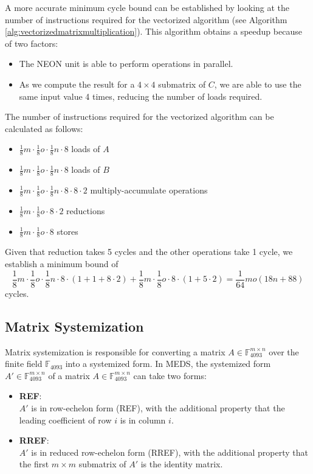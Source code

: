 \documentclass[11pt,a4paper]{report}
\theoremstyle{definition}
\begin{document}
A more accurate minimum cycle bound can be established by looking at the number of instructions required for the vectorized algorithm (see Algorithm \ref{alg:vectorizedmatrixmultiplication}). This algorithm obtains a speedup because of two factors:
\begin{itemize}
  \item The NEON unit is able to perform operations in parallel.
  \item As we compute the result for a $4\times4$ submatrix of $C$, we are able to use the same input value 4 times, reducing the number of loads required.
\end{itemize}
The number of instructions required for the vectorized algorithm can be calculated as follows:
\begin{itemize}
  \item $\frac{1}{8}m \cdot \frac{1}{8}o \cdot \frac{1}{8}n \cdot 8$ loads of $A$
  \item $\frac{1}{8}m \cdot \frac{1}{8}o \cdot \frac{1}{8}n \cdot 8$ loads of $B$
  \item $\frac{1}{8}m \cdot \frac{1}{8}o \cdot \frac{1}{8}n \cdot 8 \cdot 8 \cdot 2$ multiply-accumulate operations
  \item $\frac{1}{8}m \cdot \frac{1}{8}o \cdot 8 \cdot 2$ reductions
  \item $\frac{1}{8}m \cdot \frac{1}{8}o \cdot 8$ stores
\end{itemize}
Given that reduction takes 5 cycles and the other operations take 1 cycle, we establish a minimum bound of 
\[
  \frac{1}{8}m \cdot \frac{1}{8}o \cdot \frac{1}{8}n \cdot 8 \cdot (1 + 1 + 8 \cdot 2) + \frac{1}{8}m \cdot \frac{1}{8}o \cdot 8 \cdot (1 + 5 \cdot 2) = \frac{1}{64}mo(18n + 88)
\]
cycles.

\subsection{Matrix Systemization}
\label{sec:matrixsystemization}
Matrix systemization is responsible for converting a matrix $A \in \mathbb{F}_{4093}^{m \times n}$ over the finite field $\mathbb{F}_{4093}$ into a systemized form. In MEDS, the systemized form $A' \in \mathbb{F}_{4093}^{m \times n}$ of a matrix $A \in \mathbb{F}_{4093}^{m \times n}$ can take two forms:
\begin{itemize}
  \item \textbf{REF}:\\
  $A'$ is in row-echelon form (REF), with the additional property that the leading coefficient of row $i$ is in column $i$.
  \item \textbf{RREF}:\\
  $A'$ is in reduced row-echelon form (RREF), with the additional property that the first $m \times m$ submatrix of $A'$ is the identity matrix.
\end{itemize}
\end{document}
